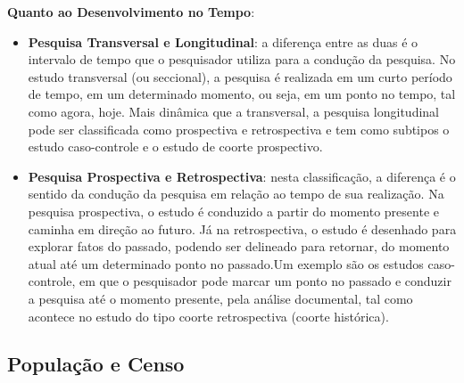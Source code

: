 \textbf{Quanto ao Desenvolvimento no Tempo}: 

\begin{itemize}
\item \textbf{Pesquisa Transversal e Longitudinal}: a diferença entre as duas é o intervalo de tempo que o pesquisador utiliza para a condução da pesquisa. No estudo transversal (ou seccional), a pesquisa é realizada em um curto período de tempo, em um determinado momento, ou seja, em um ponto no tempo, tal como agora, hoje. Mais dinâmica que a transversal, a pesquisa longitudinal pode ser classificada como prospectiva e retrospectiva e tem como subtipos o estudo caso-controle e o estudo de coorte prospectivo. 
\item \textbf{Pesquisa Prospectiva e Retrospectiva}: nesta classificação, a diferença é o sentido da condução da pesquisa em relação ao tempo de sua realização. Na pesquisa prospectiva, o estudo é conduzido a partir do momento presente e caminha em direção ao futuro. Já na retrospectiva, o estudo é desenhado para explorar fatos do passado, podendo ser delineado para retornar, do momento atual até um determinado ponto no passado.Um exemplo são os estudos caso-controle, em que o pesquisador pode marcar um ponto no passado e conduzir a pesquisa até o momento presente, pela  análise documental, tal como acontece no estudo do tipo coorte retrospectiva (coorte histórica). 
\end{itemize}


\newpage
\subsection{População e Censo}

